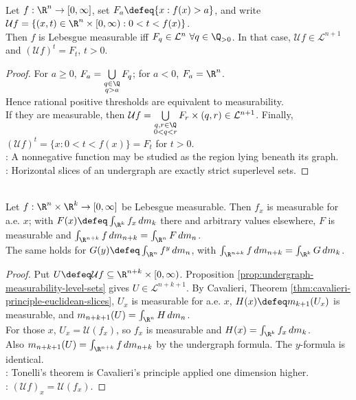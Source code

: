\begin{proposition} \label{prop:undergraph-measurability-level-sets} \\
Let $f:\R^n\to[0,\infty]$, set $F_a\defeq\{x:f(x)>a\}$, and write $\mathcal{U}f=\{(x,t)\in\R^n\times[0,\infty):0<t<f(x)\}$.\\
Then $f$ is Lebesgue measurable iff $F_q\in\mathcal{L}^n \ \forall q\in\Q_{>0}$. In that case, $\mathcal{U}f\in\mathcal{L}^{n+1}$ and $(\mathcal{U}f)^t=F_t$, $t>0$.
\begin{proof}
For $a\geq0$, $F_a=\bigcup\limits_{\substack{q\in\Q\\q>a}}F_q$; for $a<0$, $F_a=\R^n$.\\
Hence rational positive thresholds are equivalent to measurability.\\
If they are measurable, then $\mathcal{U}f =\bigcup\limits_{\substack{q,r\in\Q\\0<q<r}} F_r\times(q,r)\in\mathcal{L}^{n+1}$. Finally, $(\mathcal{U}f)^t=\{x:0<t<f(x)\}=F_t$ for $t>0$.\\
: A nonnegative function may be studied as the region lying beneath its graph.\\
: Horizontal slices of an undergraph are exactly strict superlevel sets.
\end{proof}
\end{proposition}

\begin{theorem} \label{thm:fubini-tonelli-nonnegative-euclidean} \\
Let $f:\R^n\times\R^k\to[0,\infty]$ be Lebesgue measurable. Then $f_x$ is measurable for a.e. $x$; with $F(x)\defeq\int_{\R^k}f_x\,dm_k$ there and arbitrary values elsewhere, $F$ is measurable and $\int_{\R^{n+k}} f\,dm_{n+k}=\int_{\R^n}F\,dm_n$.\\
The same holds for $G(y)\defeq\int_{\R^n}f^y\,dm_n$, with $\int_{\R^{n+k}}f\,dm_{n+k}=\int_{\R^k}G\,dm_k$.
\begin{proof}
Put $U\defeq\mathcal{U}f\subseteq\R^{n+k}\times[0,\infty)$. Proposition \ref{prop:undergraph-measurability-level-sets} gives $U\in\mathcal{L}^{n+k+1}$. By Cavalieri, Theorem \ref{thm:cavalieri-principle-euclidean-slices}, $U_x$ is measurable for a.e. $x$, $H(x)\defeq m_{k+1}(U_x)$ is measurable, and $m_{n+k+1}(U)=\int_{\R^n}H\,dm_n$.\\
For those $x$, $U_x=\mathcal{U}(f_x)$, so $f_x$ is measurable and $H(x)=\int_{\R^k}f_x\,dm_k$.\\
Also $m_{n+k+1}(U)=\int_{\R^{n+k}}f\,dm_{n+k}$ by the undergraph formula. The $y$-formula is identical.\\
: Tonelli's theorem is Cavalieri's principle applied one dimension higher.\\
: $(\mathcal{U}f)_x=\mathcal{U}(f_x)$.
\end{proof}
\end{theorem}


